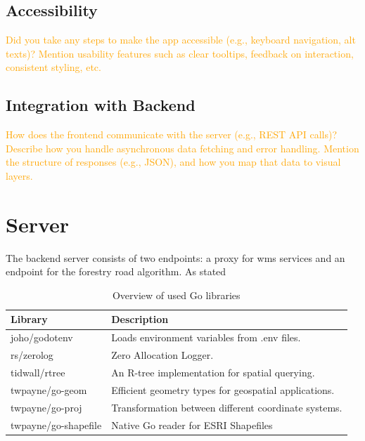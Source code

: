 \subsection{Accessibility}

\textcolor{orange}{Did you take any steps to make the app accessible (e.g., keyboard navigation, alt texts)?
Mention usability features such as clear tooltips, feedback on interaction, consistent styling, etc.}

\subsection{Integration with Backend} %

\textcolor{orange}{How does the frontend communicate with the server (e.g., REST API calls)?
Describe how you handle asynchronous data fetching and error handling.
Mention the structure of responses (e.g., JSON), and how you map that data to visual layers.}

\section{Server}\label{sec:implementation:server}

The backend server consists of two endpoints: a proxy for \Gls{wms} services and an endpoint for the forestry road algorithm. As stated 

\begin{table}[h]
    \centering
    \begin{tabular}{|l|l|}
        \hline
        \textbf{Library} & \textbf{Description} \\
        \hline
        joho/godotenv & Loads environment variables from .env files. \\
        rs/zerolog & Zero Allocation Logger. \\
        tidwall/rtree & An R-tree implementation for spatial querying. \\
        twpayne/go-geom & Efficient geometry types for geospatial applications. \\
        twpayne/go-proj & Transformation between different coordinate systems. \\
        twpayne/go-shapefile & Native Go reader for ESRI Shapefiles \\
        \hline
    \end{tabular}
    \caption{Overview of used Go libraries}
    \label{tab:go_libraries}
\end{table}


